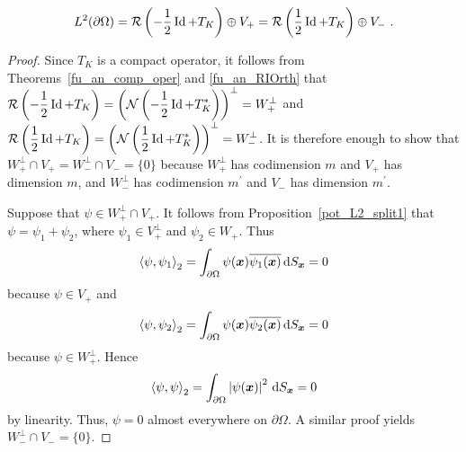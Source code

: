 \begin{cor} \label{pot_cor_splitL2}
\[
L^2(\partial \Omega) = \IMG \left( -\frac{1}{2} \Id + T_K\right)
\oplus V_+ = \IMG \left( \frac{1}{2} \Id + T_K\right) \oplus V_- \ .
\]
\end{cor}

\begin{proof}
Since $\displaystyle T_K$ is a compact operator, it
follows from Theorems~\ref{fu_an_comp_oper} and \ref{fu_an_RIOrth} that\\
$\displaystyle  \mathcal{R} \left(-\frac{1}{2} \operatorname{Id} + T_K\right)
= \left( \mathcal{N} \left(-\frac{1}{2} \operatorname{Id} + T_K^\ast \right) \right)^\perp
= W_+^\perp$
and 
$\displaystyle \mathcal{R} \left(\frac{1}{2} \operatorname{Id} + T_K\right)
= \left( \mathcal{N} \left(\frac{1}{2} \operatorname{Id} + T_K^\ast \right) \right)^\perp
= W_-^\perp$.
It is therefore enough to show that
$\displaystyle W_+^\perp \cap V_+ = W_-^\perp \cap V_- = \{0\}$
because $\displaystyle W_+^\perp$ has codimension $m$ and $V_+$ has
dimension $m$, and $\displaystyle W_-^\perp$ has codimension
$\displaystyle m^{\prime}$ and $V_-$ has dimension $\displaystyle m^{\prime}$.

Suppose that $\displaystyle \psi \in W^\perp_+ \cap V_+$.  It follows from
Proposition~\ref{pot_L2_split1} that $\psi = \psi_1+\psi_2$, where
$\displaystyle \psi_1 \in V^\perp_+$ and $\psi_2 \in W_+$.  Thus
\[
\left\langle{\psi} , {\psi_1}\right\rangle_2 = \int_{\partial \Omega}
\psi({\bm{x}})\overline{\psi_1({\bm{x}})} \,\mathrm{d}{S}_{{\bm{x}}} = 0
\]
because $\psi \in V_+$ and
\[
\left\langle{\psi} , {\psi_2}\right\rangle_2 = \int_{\partial \Omega}
\psi({\bm{x}})\overline{\psi_2({\bm{x}})} \,\mathrm{d}{S}_{{\bm{x}}} = 0
\]
because $\psi \in W_+^\perp$.  Hence
\[
\left\langle{\psi} , {\psi}\right\rangle_2 = \int_{\partial \Omega}
\left| \psi({\bm{x}}) \right|^2 \,\mathrm{d}{S}_{{\bm{x}}} = 0
\]
by linearity.  Thus, $\psi=0$ almost everywhere on $\partial \Omega$.
A similar proof yields $\displaystyle W_-^\perp \cap V_- = \{0\}$.
\end{proof}

